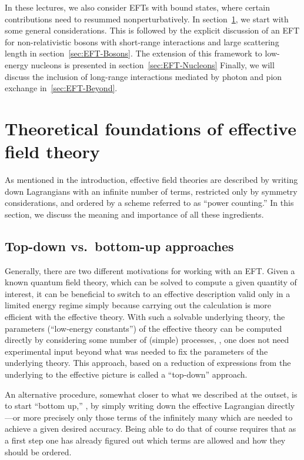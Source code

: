 In these lectures, we also consider EFTs with bound states, where 
certain contributions need to resummed nonperturbatively. In
section~\ref{sec:EFT-Basics}, we start with some general considerations.
This is followed by the explicit discussion of an EFT for 
non-relativistic bosons with short-range interactions 
and large scattering length in section~\ref{sec:EFT-Bosons}.  The extension of 
this framework 
to low-energy nucleons is presented in section~\ref{sec:EFT-Nucleons}
Finally, we will discuss the inclusion of long-range interactions
mediated by photon and pion exchange in~\ref{sec:EFT-Beyond}.

%
\section{Theoretical foundations of effective field theory}
\label{sec:EFT-Basics}

As mentioned in the introduction, effective field theories are described by 
writing down Lagrangians with an infinite number of terms, restricted only by 
symmetry considerations, and ordered by a scheme referred to as ``power 
counting.''  In this section, we discuss the meaning and importance of all 
these ingredients.

\subsection{Top-down vs.\ bottom-up approaches}

Generally, there are two different motivations for working with an EFT.  Given a 
known quantum field theory, which can be solved to compute a given quantity of 
interest, it can be beneficial to switch to an effective description valid only 
in a limited energy regime simply because carrying out the calculation is more 
efficient with the effective theory.  With such a solvable underlying theory, 
the parameters (``low-energy constants'') of the effective theory can be 
computed directly by considering some number of (simple) processes, \ie, one 
does not need experimental input beyond what was needed to fix the parameters 
of the underlying theory.  This approach, based on a reduction of expressions 
from the underlying to the effective picture is called a ``top-down'' approach.

An alternative procedure, somewhat closer to what we described at the outset, 
is to start ``bottom up,'' \ie, by simply writing down the effective 
Lagrangian directly---or more precisely only those terms of the infinitely 
many which are needed to achieve a given desired accuracy.  Being able to 
do that of course requires that as a first step one has already figured out 
which terms are allowed and how they should be ordered.

